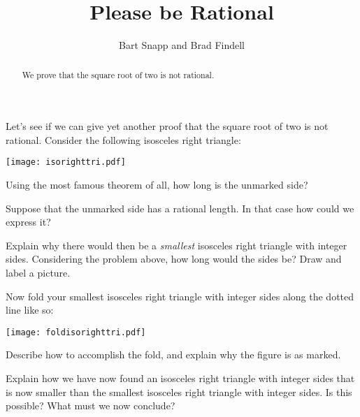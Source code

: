 \documentclass[nooutcomes]{ximera}
\title{Please be Rational}
\author{Bart Snapp and Brad Findell}
\begin{document}
\begin{abstract}
  We prove that the square root of two is not rational.
\end{abstract}
\maketitle

Let's see if we can give yet another proof that the square root of two
is not rational. Consider the following isosceles right triangle:
\begin{image}
\texttt{[image: isorighttri.pdf]}
\end{image}
\begin{problem}
Using the most famous theorem of all, how long is the unmarked side?
\vspace{0.5in}
\end{problem}

\begin{problem} 
Suppose that the unmarked side has a rational length. In that case how
could we express it?
\vspace{0.5in}
\end{problem}

\begin{problem}
Explain why there would then be a \textit{smallest} isosceles right
triangle with integer sides. Considering the problem above, how long
would the sides be? Draw and label a picture.
\vfill
\end{problem}

\newpage
\begin{problem}
Now fold your smallest isosceles right triangle with integer sides
along the dotted line like so:
\begin{image}
\texttt{[image: foldisorighttri.pdf]}
\end{image}
Describe how to accomplish the fold, and explain why the figure is as marked.  
\vfill
\end{problem}

\begin{problem}
Explain how we have now found an isosceles right triangle with integer
sides that is now smaller than the smallest isosceles right triangle
with integer sides. Is this possible? What must we now conclude?
\vfill
\end{problem}
\end{document}
